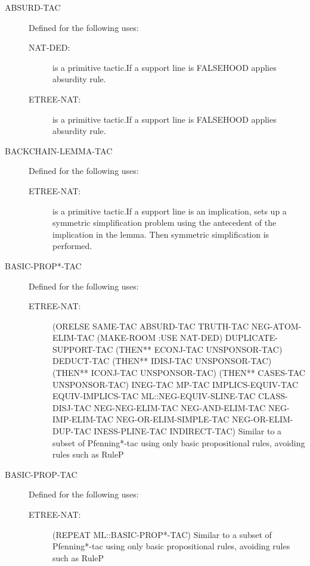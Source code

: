 \begin{description} 
\item[ABSURD-TAC]  Defined for the following uses:
\begin{description}
\item[NAT-DED:]  is a primitive tactic.If a support line is FALSEHOOD applies absurdity rule.

\item[ETREE-NAT:]  is a primitive tactic.If a support line is FALSEHOOD applies absurdity rule.

\end{description}

\item[BACKCHAIN-LEMMA-TAC]  Defined for the following uses:
\begin{description}
\item[ETREE-NAT:]  is a primitive tactic.If a support line is an implication, sets up a symmetric simplification
problem using the antecedent of the implication in the lemma.  Then
symmetric simplification is performed.

\end{description}

\item[BASIC-PROP*-TAC]  Defined for the following uses:
\begin{description}
\item[ETREE-NAT:] 
(ORELSE SAME-TAC ABSURD-TAC TRUTH-TAC NEG-ATOM-ELIM-TAC
 (MAKE-ROOM :USE NAT-DED) DUPLICATE-SUPPORT-TAC
 (THEN** ECONJ-TAC UNSPONSOR-TAC) DEDUCT-TAC
 (THEN** IDISJ-TAC UNSPONSOR-TAC) (THEN** ICONJ-TAC UNSPONSOR-TAC)
 (THEN** CASES-TAC UNSPONSOR-TAC) INEG-TAC MP-TAC IMPLICS-EQUIV-TAC
 EQUIV-IMPLICS-TAC ML::NEG-EQUIV-SLINE-TAC CLASS-DISJ-TAC
 NEG-NEG-ELIM-TAC NEG-AND-ELIM-TAC NEG-IMP-ELIM-TAC
 NEG-OR-ELIM-SIMPLE-TAC NEG-OR-ELIM-DUP-TAC INESS-PLINE-TAC
 INDIRECT-TAC)
Similar to a subset of Pfenning*-tac using only basic propositional rules, avoiding rules such as RuleP

\end{description}

\item[BASIC-PROP-TAC]  Defined for the following uses:
\begin{description}
\item[ETREE-NAT:] 
(REPEAT ML::BASIC-PROP*-TAC)
Similar to a subset of Pfenning*-tac using only basic propositional rules, avoiding rules such as RuleP


\end{description}
\end{description}
